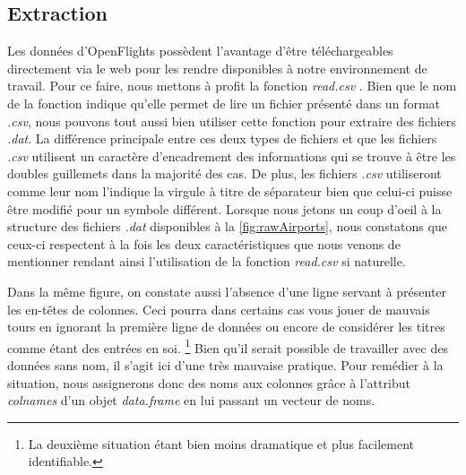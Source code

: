 \subsection{Extraction}

\label{subsec:extraction}
Les données d'OpenFlights possèdent l'avantage d'être téléchargeables directement via le web pour les rendre disponibles à notre environnement de travail. Pour ce faire, nous mettons à profit la fonction \emph{read.csv} \cite{Rfunction:read.csv}. Bien que le nom de la fonction indique qu'elle permet de lire un fichier présenté dans un format \emph{.csv}, nous pouvons tout aussi bien utiliser cette fonction pour extraire des fichiers \emph{.dat}. La différence principale entre ces deux types de fichiers et que les fichiers \emph{.csv} utilisent un caractère d'encadrement des informations qui se trouve à être les doubles guillemets dans la majorité des cas. De plus, les fichiers \emph{.csv} utiliseront comme leur nom l'indique la virgule à titre de séparateur bien que celui-ci puisse être modifié pour un symbole différent.\cite{CSVDAT} Lorsque nous jetons un coup d'oeil à la structure des fichiers \emph{.dat} disponibles à la \autoref{fig:rawAirports}, nous constatons que ceux-ci respectent à la fois les deux caractéristiques que nous venons de mentionner rendant ainsi l'utilisation de la fonction \emph{read.csv} si naturelle. \\


\noindent
Dans la même figure, on constate aussi l'absence d'une ligne servant à présenter les en-têtes de colonnes. Ceci pourra dans certains cas vous jouer de mauvais tours en ignorant la première ligne de données ou encore de considérer les titres comme étant des entrées en soi. \footnote{La deuxième situation étant bien moins dramatique et plus facilement identifiable.}  Bien qu'il serait possible de travailler avec des données sans nom, il s'agit ici d'une très mauvaise pratique. Pour remédier à la situation, nous assignerons donc des noms aux colonnes grâce à l'attribut \emph{colnames} d'un objet \emph{data.frame} en lui passant un vecteur de noms.\\

